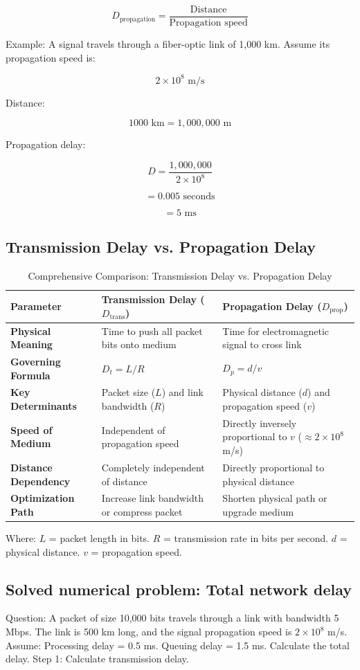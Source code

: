 \[
\boxed{D_{\text{propagation}}=\frac{\text{Distance}}{\text{Propagation speed}}}
\]

Example:
A signal travels through a fiber-optic link of 1,000 km.
Assume its propagation speed is:

\[
2\times10^8\text{ m/s}
\]

Distance:

\[
1000\text{ km}=1,000,000\text{ m}
\]

Propagation delay:

\[
D=\frac{1,000,000}{2\times10^8}
\]


\[
=0.005\text{ seconds}
\]


\[
=\boxed{5\text{ ms}}
\]

\subsection{Transmission Delay vs. Propagation Delay}
\begin{table}[htbp]
\centering
\caption{Comprehensive Comparison: Transmission Delay vs. Propagation Delay}
\label{tab:trans_vs_prop_delay}
\begin{tabularx}{\textwidth}{p{3.8cm} X X}
\toprule
\textbf{Parameter} & \textbf{Transmission Delay ($D_{\text{trans}}$)} & \textbf{Propagation Delay ($D_{\text{prop}}$)} \\
\midrule
\textbf{Physical Meaning} & Time to push all packet bits onto medium & Time for electromagnetic signal to cross link \\
\textbf{Governing Formula} & $D_t = L / R$ & $D_p = d / v$ \\
\textbf{Key Determinants} & Packet size ($L$) and link bandwidth ($R$) & Physical distance ($d$) and propagation speed ($v$) \\
\textbf{Speed of Medium} & Independent of propagation speed & Directly inversely proportional to $v$ ($\approx 2\times 10^8$ m/s) \\
\textbf{Distance Dependency} & Completely independent of distance & Directly proportional to physical distance \\
\textbf{Optimization Path} & Increase link bandwidth or compress packet & Shorten physical path or upgrade medium \\
\bottomrule
\end{tabularx}
\end{table}
Where:
$L$ = packet length in bits.
$R$ = transmission rate in bits per second.
$d$ = physical distance.
$v$ = propagation speed.
\subsection{Solved numerical problem: Total network delay}
Question:
A packet of size 10,000 bits travels through a link with bandwidth 5 Mbps. The link is 500 km long, and the signal propagation speed is $2\times10^8$ m/s.
Assume:
Processing delay = 0.5 ms.
Queuing delay = 1.5 ms.
Calculate the total delay.
Step 1: Calculate transmission delay.

